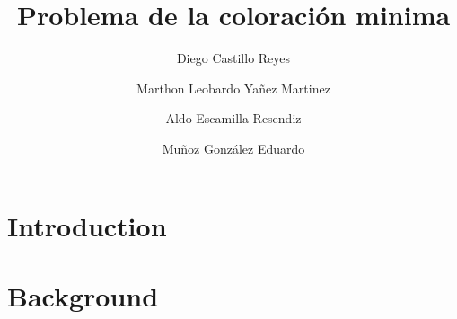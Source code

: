 \documentclass[9pt,a4paper,twoside]{tau-class/tau}
\title{Problema de la coloración minima}%
\author[a]{Diego Castillo Reyes}
\author[a]{Marthon Leobardo Yañez Martinez}
\author[a]{Aldo Escamilla Resendiz}
\author[a]{Muñoz González Eduardo}
\affil[a]{Researcher}
\begin{document}
	
    \maketitle 
    \thispagestyle{firststyle} 
    \tauabstract
    \tableofcontents

\section{Introduction}

    


\section{Background}





\end{document}
